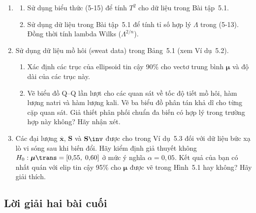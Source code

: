 \begin{enumerate}[label=\textbf{5.\arabic*.}, leftmargin=2.8em]
    \item
    \begin{enumerate}[label=(\alph*)]
        \item Sử dụng biểu thức (5-15) để tính $T^2$ cho dữ liệu trong Bài tập~5.1.
        \item Sử dụng dữ liệu trong Bài tập~5.1 để tính tỉ số hợp lý $\Lambda$ trong (5-13). Đồng thời tính lambda Wilks ($\Lambda^{2/n}$).
    \end{enumerate}

    \item Sử dụng dữ liệu mồ hôi (sweat data) trong Bảng~5.1 (xem Ví dụ~5.2).
    \begin{enumerate}[label=(\alph*)]
        \item Xác định các trục của ellipsoid tin cậy 90\% cho vectơ trung bình $\boldsymbol{\mu}$ và độ dài của các trục này.
        \item Vẽ biểu đồ Q--Q lần lượt cho các quan sát về tốc độ tiết mồ hôi, hàm lượng natri và hàm lượng kali. Vẽ ba biểu đồ phân tán khả dĩ cho từng cặp quan sát. Giả thiết phân phối chuẩn đa biến có hợp lý trong trường hợp này không? Hãy nhận xét.
    \end{enumerate}

    \item Các đại lượng $\overline{\mathbf{x}}$, $\mathbf{S}$ và $\mathbf{S}\inv$ được cho trong Ví dụ~5.3 đối với dữ liệu bức xạ lò vi sóng sau khi biến đổi. Hãy kiểm định giả thuyết không $H_0: \boldsymbol{\mu}\trans = [0{,}55,\; 0{,}60]$ ở mức ý nghĩa $\alpha = 0{,}05$. Kết quả của bạn có nhất quán với elip tin cậy 95\% cho $\boldsymbol{\mu}$ được vẽ trong Hình~5.1 hay không? Hãy giải thích.
\end{enumerate}

\subsection*{Lời giải hai bài cuối}

